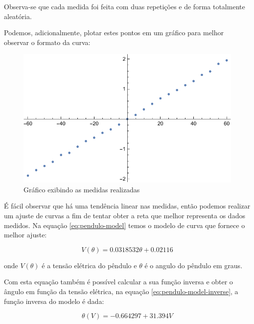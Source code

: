 \documentclass[12pt,a4paper]{instrumentacao}
\begin{document}

Observa-se que cada medida foi feita com duas repetições e de forma totalmente aleatória.

Podemos, adicionalmente, plotar estes pontos em um gráfico para melhor observar o formato da curva:

\begin{figure}[H]
\includegraphics[width=\textwidth]{../Mathematica/images/Pendulo-Pontos.pdf}
\caption{Gráfico exibindo as medidas realizadas}
\label{fig:pendulo-medidas}
\end{figure}

É fácil observar que há uma tendência linear nas medidas, então podemos realizar um ajuste de curvas a fim de tentar obter a reta que melhor representa os dados medidos. Na equação \ref{eq:pendulo-model} temos o modelo de curva que fornece o melhor ajuste:

\begin{equation}
	V(\theta) = 0.0318532 \theta +0.02116
	\label{eq:pendulo-model}
\end{equation}

onde $V(\theta)$ é a tensão elétrica do pêndulo e $\theta$ é o angulo do pêndulo em graus.

Com esta equação também é possível calcular a sua função inversa e obter o ângulo em função da tensão elétrica, na equação \ref{eq:pendulo-model-inverse}, a função inversa do modelo é dada:

\begin{equation}
	\theta(V) = -0.664297 + 31.394 V
	\label{eq:pendulo-model-inverse}
\end{equation}
\end{document}
